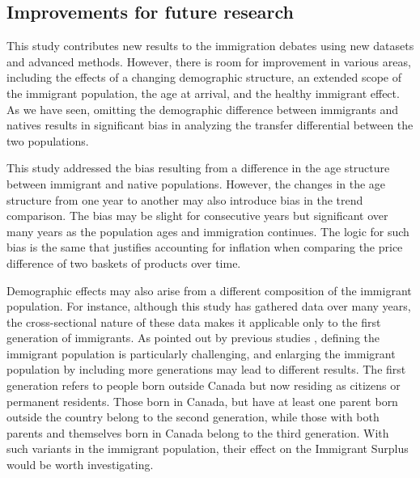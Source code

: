 

\subsection{Improvements for future research}
This study contributes new results to the immigration debates using new datasets and advanced methods.
However, there is room for improvement in various areas, including the effects of a changing demographic structure, an extended scope of the immigrant population, the age at arrival, and the healthy immigrant effect.
As we have seen, omitting the demographic difference between immigrants and natives results in significant bias in analyzing the transfer differential between the two populations.

\vspace{0.7em}\par
This study addressed the bias resulting from a difference in the age structure between immigrant and native populations. However, the changes in the age structure from one year to another may also introduce bias in the trend comparison. The bias may be slight for consecutive years but significant over many years as the population ages and immigration continues.
The logic for such bias is the same that justifies accounting for inflation when comparing the price difference of two baskets of products over time.

\vspace{0.7em}\par
Demographic effects may also arise from a different composition of the immigrant population.
For instance, although this study has gathered data over many years, the cross-sectional nature of these data makes it applicable only to the first generation of immigrants.
As pointed out by previous studies \citep{Lee:1998fs}, defining the immigrant population is particularly challenging, and enlarging the immigrant population by including more generations may lead to different results.
The first generation refers to people born outside Canada but now residing as citizens or permanent residents.
Those born in Canada, but have at least one parent born outside the country belong to the second generation, while those with both parents and themselves born in Canada belong to the third generation.
With such variants in the immigrant population, their effect on the Immigrant Surplus would be worth investigating.

